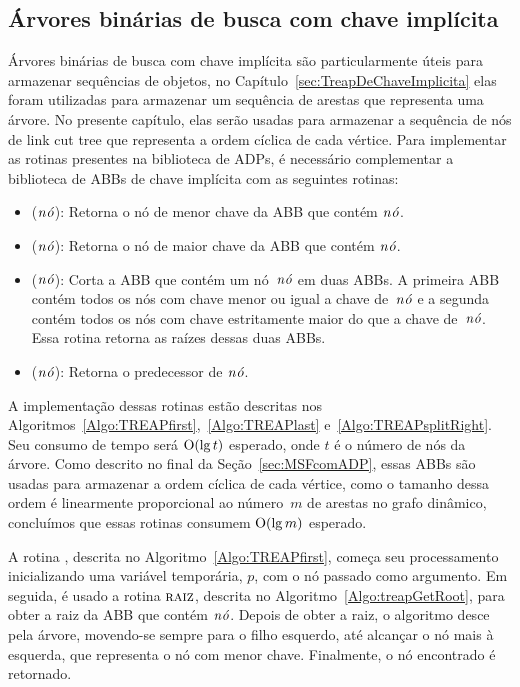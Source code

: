 \subsection{Árvores binárias de busca com chave implícita}

Árvores binárias de busca com chave implícita são particularmente úteis para armazenar sequências de objetos, no Capítulo~\ref{sec:TreapDeChaveImplicita} elas foram utilizadas para armazenar um sequência de arestas que representa uma árvore.
No presente capítulo, elas serão usadas para armazenar a sequência de nós de link cut tree que representa a ordem cíclica de cada vértice.
Para implementar as rotinas presentes na biblioteca de ADPs, é necessário complementar a biblioteca de ABBs de chave implícita com as seguintes rotinas:
\begin{itemize}
\item \treapFirst($\mathit{n\acute{o}}$): Retorna o nó de menor chave da ABB que contém $\mathit{n\acute{o}}$.
\item \treapLast($\mathit{n\acute{o}}$): Retorna o nó de maior chave da ABB que contém $\mathit{n\acute{o}}$.
\item \treapSplitRight($\mathit{n\acute{o}}$): Corta a ABB que contém um nó~$\mathit{n\acute{o}}$ em duas ABBs. A primeira ABB contém todos os nós com chave menor ou igual a chave de~$\mathit{n\acute{o}}$ e a segunda contém todos os nós com chave estritamente maior do que a chave de~$\mathit{n\acute{o}}$. Essa rotina retorna as raízes dessas duas ABBs.
\item \treapPredecessor($\mathit{n\acute{o}}$): Retorna o predecessor de $\mathit{n\acute{o}}$.
\end{itemize}

A implementação dessas rotinas estão descritas nos Algoritmos~\ref{Algo:TREAPfirst},~\ref{Algo:TREAPlast} e~\ref{Algo:TREAPsplitRight}.
Seu consumo de tempo será $\mathrm{O}(\lg t)$ esperado, onde $t$ é o número de nós da árvore.
Como descrito no final da Seção~\ref{sec:MSFcomADP}, essas ABBs são usadas para armazenar a ordem cíclica de cada vértice, como o tamanho dessa ordem é linearmente proporcional ao número~$m$ de arestas no grafo dinâmico, concluímos que essas rotinas consumem $\mathrm{O}(\lg m)$ esperado.  

A rotina \treapFirst{}, descrita no Algoritmo~\ref{Algo:TREAPfirst}, começa seu processamento inicializando uma variável temporária, $p$, com o nó passado como argumento.
Em seguida, é usado a rotina $\text{\scshape raiz}$, descrita no Algoritmo~\ref{Algo:treapGetRoot}, para obter a raiz da ABB que contém $\mathit{n\acute{o}}$.
Depois de obter a raiz, o algoritmo desce pela árvore, movendo-se sempre para o filho esquerdo, até alcançar o nó mais à esquerda, que representa o nó com menor chave.
Finalmente, o nó encontrado é retornado.

